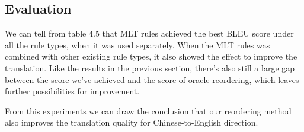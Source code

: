 \subsection{Evaluation}

We can tell from table $4.5$ that MLT rules achieved the best BLEU score under all the rule types, when it was used separately. When the MLT rules was combined with other existing rule types, it also showed the effect to improve the translation. Like the results in the previous section, there's also still a large gap between the score we've achieved and the score of oracle reordering, which leaves further possibilities for improvement.%

From this experiments we can draw the conclusion that our reordering method also improves the translation quality for Chinese-to-English direction.


%
%
%
%
%
%
%

